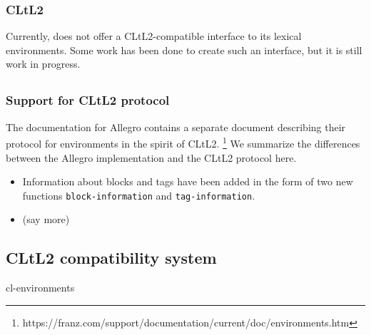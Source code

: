 \subsubsection{CLtL2}

Currently, \ecl{} does not offer a CLtL2-compatible interface to its
lexical environments.  Some work has been done to create such an
interface, but it is still work in progress.

\subsection{\allegro{}}
\label{sec-previous-allegro}

\subsubsection{Support for CLtL2 protocol}

The documentation for Allegro \commonlisp{} contains a separate
document describing their protocol for environments in the spirit of
CLtL2.%
\footnote{https://franz.com/support/documentation/current/doc/environments.htm}
We summarize the differences between the Allegro implementation and
the CLtL2 protocol here.

\begin{itemize}
\item Information about blocks and tags have been added in the form of
  two new functions \texttt{block-information} and
  \texttt{tag-information}.
\item (say more)
\end{itemize}

\subsection{\lispworks{}}

\subsection{CLtL2 compatibility system}

cl-environments
